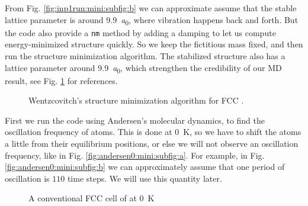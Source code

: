 From Fig. \ref{fig:inp1run:mini:subfig:b} we can approximate assume that the stable
lattice parameter is around \SI{9.9}{\bohr}, where vibration happens back and forth.
But the code also provide a \texttt{nm} method by adding a damping to let us compute energy-minimized structure quickly. So we keep the fictitious mass fixed,
and then run the structure minimization algorithm. The stabilized structure also has a
lattice parameter around \SI{9.9}{\bohr}, which strengthen the credibility of our MD result,
see Fig. \ref{fig:inp5} for references.

\begin{figure}[h]
  \hfill
  \caption{Wentzcovitch's structure minimization algorithm for FCC .}
  \label{fig:inp5}   %
\end{figure}


First we run the code using Andersen's molecular dynamics, to find the oscillation frequency of atoms. This is done at \SI{0}{\kelvin}, so we have to shift the atoms a little from their equilibrium
positions, or else we will not observe an oscillation frequency, like in Fig. \ref{fig:andersen0:mini:subfig:a}.
For example, in Fig. \ref{fig:andersen0:mini:subfig:b} we can approximately assume that
one period of oscillation is $110$ time steps. We will use this quantity later.
\begin{figure}[h]
	\centering
	\hfill
	\caption{A conventional FCC cell of  at \SI{0}{\kelvin}}
	\label{fig:andersen0}   %
\end{figure}


